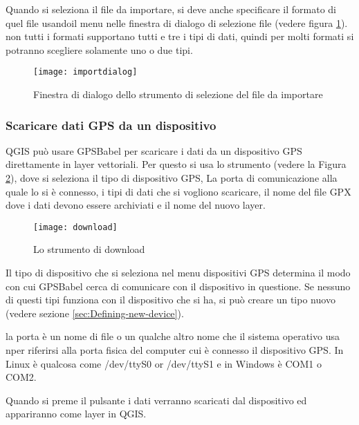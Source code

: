 Quando si seleziona il file da importare, si deve anche specificare il formato di quel file usandoil menu nelle finestra di dialogo di selezione file (vedere figura \ref{figure importdialog}). non tutti i formati supportano tutti e tre i tipi di dati, quindi per molti formati si potranno scegliere solamente uno o due tipi.

\begin{figure}[ht]
   \begin{center}
\caption{\label{figure importdialog} Finestra di dialogo dello strumento di selezione del file da importare \nixcaption}
\texttt{[image: importdialog]}
   \end{center}
\end{figure}

\subsubsection{Scaricare dati GPS da un dispositivo}

QGIS può usare GPSBabel per scaricare i dati da un dispositivo GPS direttamente in layer vettoriali.
Per questo si usa lo strumento  (vedere la Figura \ref{figure_download}), dove si seleziona il tipo di dispositivo GPS, La porta di comunicazione alla quale lo si è connesso, i tipi di dati che si vogliono scaricare, il nome del file GPX dove i dati devono essere archiviati e il nome del nuovo layer.

\begin{figure}[ht]
   \begin{center}
\caption{\label{figure_download}Lo strumento di download \nixcaption}
\texttt{[image: download]}
   \end{center}
\end{figure}


Il tipo di dispositivo che si seleziona nel menu dispositivi GPS determina il modo con cui GPSBabel cerca di comunicare con il dispositivo in questione. Se nessuno di questi tipi funziona con il dispositivo che si ha, si può creare un tipo nuovo (vedere sezione \ref{sec:Defining-new-device}).

la porta è un nome di file o un qualche altro nome che il sistema operativo usa nper riferirsi alla porta fisica del computer cui è connesso il dispositivo GPS.
\nix In Linux è qualcosa come /dev/ttyS0 or /dev/ttyS1 e in \win Windows è COM1 o COM2.

Quando si preme il pulsante  i dati verranno scaricati dal dispositivo ed appariranno come layer in QGIS.

